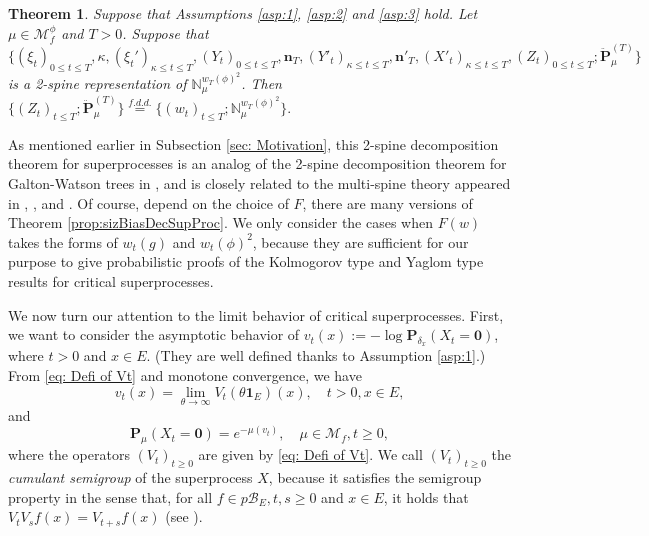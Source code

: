 \documentclass[UTF8]{pkuthss}
\theoremstyle{plain}
\newtheorem{thm}{Theorem}[section]
\theoremstyle{definition}
\numberwithin{equation}{section}
\begin{document}
\begin{thm}\label{prop:2-spine-decomposition}
	Suppose that Assumptions \ref{asp:1}, \ref{asp:2} and \ref{asp:3} hold.
	Let $\mu\in\mathcal M_f^\phi$ and $T>0$.
	Suppose that
$
	\{(\xi_t)_{0\leq t\leq T}, \kappa, (\xi_t')_{\kappa\leq t\leq T}, (Y_t)_{0\leq t\leq T}, \mathbf n_T,(Y'_t)_{\kappa \leq t\leq T}, \mathbf n'_T, (
	X'_t)_{\kappa \leq t\leq T}, (Z_t)_{0\leq t\leq T} ; \ddot {\mathbf P}_\mu^{(T)}\}
$
	is a 2-spine representation of $\mathbb N_\mu^{w_T(\phi)^2}$.
	Then
$
	\{(Z_t)_{t\leq T}; \ddot {\mathbf P}^{(T)}_\mu\}
	\overset{f.d.d.}{=} \{(w_t)_{t\leq T}; \mathbb N^{w_T(\phi)^2}_\mu\}.
$
\end{thm}
As mentioned earlier in Subsection \ref{sec: Motivation},
	this 2-spine decomposition theorem for superprocesses is an analog of the 2-spine decomposition theorem for Galton-Watson trees in \cite{RenSongSun20182spine}, and is closely related to the multi-spine theory appeared in  \cite{HarrisRoberts2017Manytofew}, \cite{HarrisJohnstonRoberts2017Coalescent}, \cite{Johnston2017Genealogy} and \cite{AbrahamDebs2018Penalization}.
Of course, depend on the choice of $F$, there are many versions of Theorem \ref{prop:sizBiasDecSupProc}.
	We only consider the cases when $F(w)$ takes the forms of $w_t(g)$ and $w_t(\phi)^2$, because they are sufficient for our purpose to give probabilistic proofs of the Kolmogorov type and Yaglom type results for critical superprocesses.

	We now turn our attention to the limit behavior of critical superprocesses. First, we want to consider the asymptotic behavior of $v_t(x):= - \log \mathbf P_{\delta_x}(X_t = \mathbf 0)$, where $t>0$ and $x\in E$. (They are well defined thanks to Assumption \ref{asp:1}.)
	From \eqref{eq: Defi of Vt} and monotone convergence, we have
\begin{equation}
\label{eq: defi of vt}
	v_t(x) = \lim_{\theta \to \infty}V_t(\theta \mathbf 1_E)(x),
	\quad t> 0, x\in E,
\end{equation}
and
\begin{equation}\label{eq: extinction probability with vt}
	\mathbf P_{\mu}(X_t = \mathbf 0) = e^{- \mu(v_t) },
	\quad \mu \in \mathcal M_f, t\geq 0,
\end{equation}
 where the operators $(V_t)_{t\geq 0}$ are given by \eqref{eq: Defi of Vt}.
	We call $(V_t)_{t \geq 0}$ the \emph{cumulant semigroup} of the superprocess $X$, because it satisfies the semigroup property in the sense that, for all $f\in p\mathscr B_E, t, s \geq 0$ and $x \in E$, it holds that $V_t V_sf(x) = V_{t+s} f(x)$ (see \cite[Theorem 2.21]{Li2011MeasureValued}).
\end{document}
